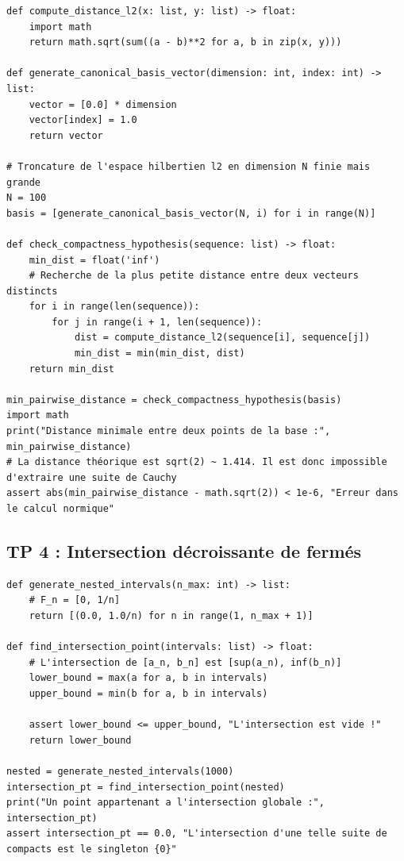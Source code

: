 \documentclass[11pt,a4paper]{article}
\begin{document}
\begin{lstlisting}
def compute_distance_l2(x: list, y: list) -> float:
    import math
    return math.sqrt(sum((a - b)**2 for a, b in zip(x, y)))

def generate_canonical_basis_vector(dimension: int, index: int) -> list:
    vector = [0.0] * dimension
    vector[index] = 1.0
    return vector

# Troncature de l'espace hilbertien l2 en dimension N finie mais grande
N = 100
basis = [generate_canonical_basis_vector(N, i) for i in range(N)]

def check_compactness_hypothesis(sequence: list) -> float:
    min_dist = float('inf')
    # Recherche de la plus petite distance entre deux vecteurs distincts
    for i in range(len(sequence)):
        for j in range(i + 1, len(sequence)):
            dist = compute_distance_l2(sequence[i], sequence[j])
            min_dist = min(min_dist, dist)
    return min_dist

min_pairwise_distance = check_compactness_hypothesis(basis)
import math
print("Distance minimale entre deux points de la base :", min_pairwise_distance)
# La distance théorique est sqrt(2) ~ 1.414. Il est donc impossible d'extraire une suite de Cauchy
assert abs(min_pairwise_distance - math.sqrt(2)) < 1e-6, "Erreur dans le calcul normique"
\end{lstlisting}

\subsection*{TP 4 : Intersection décroissante de fermés}

\begin{lstlisting}
def generate_nested_intervals(n_max: int) -> list:
    # F_n = [0, 1/n]
    return [(0.0, 1.0/n) for n in range(1, n_max + 1)]

def find_intersection_point(intervals: list) -> float:
    # L'intersection de [a_n, b_n] est [sup(a_n), inf(b_n)]
    lower_bound = max(a for a, b in intervals)
    upper_bound = min(b for a, b in intervals)

    assert lower_bound <= upper_bound, "L'intersection est vide !"
    return lower_bound

nested = generate_nested_intervals(1000)
intersection_pt = find_intersection_point(nested)
print("Un point appartenant a l'intersection globale :", intersection_pt)
assert intersection_pt == 0.0, "L'intersection d'une telle suite de compacts est le singleton {0}"
\end{lstlisting}
\end{document}
